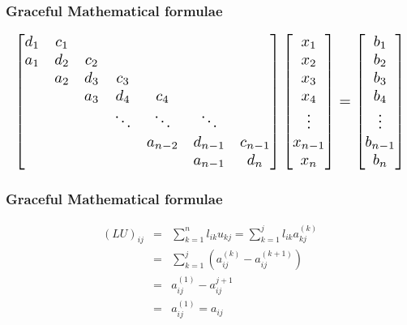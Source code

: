 \documentclass[notheorems,serif,table,compress]{beamer}  %
\begin{document}
%
\begin{frame}
\frametitle{Graceful Mathematical formulae}
\begin{tcolorbox}[colback=blue!5,colframe=blue!75!black]
\begin{displaymath}
\resizebox{1\hsize}{!}{$
\begin{bmatrix}
d_1 & c_1  &        &             &              &                 & \\
a_1 & d_2 & c_2 &             &              &                 & \\
      & a_2 & d_3 &   c_3    &              &                 & \\
      &        & a_3 &   d_4     & c_4      &                 &  \\
      &        &         & \ddots &\ddots  & \ddots    & \\
      &        &         &              &a_{n-2}&   d_{n-1} & c_{n-1}\\
      &        &         &              &               &   a_{n-1} & d_n
\end{bmatrix}
\begin{bmatrix}
x_1\\
x_2\\
x_3\\
x_4\\
\vdots\\
x_{n-1}\\
x_n
\end{bmatrix}
=\begin{bmatrix}
b_1\\
b_2\\
b_3\\
b_4\\
\vdots\\
b_{n-1}\\
b_n
\end{bmatrix}$}
\end{displaymath}
\end{tcolorbox} 
 
\end{frame}

%
\begin{frame}
\frametitle{Graceful Mathematical formulae}
\begin{tcolorbox}[colback=blue!5,colframe=blue!75!black]
\begin{eqnarray*}
(LU)_{ij}&=&\sum_{k=1}^{n}l_{ik}u_{kj}=\sum_{k=1}^{j}l_{ik}a_{kj}^{(k)}\\
&=&\sum_{k=1}^{j}(a_{ij}^{(k)}-a_{ij}^{(k+1)})\\
&=&a_{ij}^{(1)}-a_{ij}^{j+1}\\
&=&a_{ij}^{(1)}=a_{ij}
\end{eqnarray*}
\end{tcolorbox}
  
\end{frame}
\end{document}
